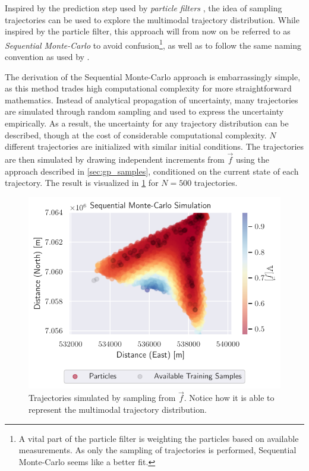Inspired by the prediction step used by \textit{particle filters} \cite{sensorfusjon}, the idea of sampling trajectories can be used to explore the multimodal trajectory distribution. While inspired by the particle filter, this approach will from now on be referred to as \textit{Sequential Monte-Carlo} to avoid confusion\footnote{A vital part of the particle filter is weighting the particles based on available measurements. As only the sampling of trajectories is performed, Sequential Monte-Carlo seems like a better fit.}, as well as to follow the same naming convention as used by \citeauthor{pedestrian} \cite{pedestrian}.

The derivation of the Sequential Monte-Carlo approach is embarrassingly simple, as this method trades high computational complexity for more straightforward mathematics. Instead of analytical propagation of uncertainty, many trajectories are simulated through random sampling and used to express the uncertainty empirically. As a result, the uncertainty for any trajectory distribution can be described, though at the cost of considerable computational complexity.
$N$ different trajectories are initialized with similar initial conditions. The trajectories are then simulated by drawing independent increments from $\vec{f}$ using the approach described in \cref{sec:gp_samples}, conditioned on the current state of each trajectory. The result is visualized in \cref{fig:gp_particle} for $N=500$ trajectories.
\begin{figure}[h]
    \centering
    \includegraphics[width=\textwidth]{figures/dyngp/gp_particle.pdf}
    \caption{Trajectories simulated by sampling from $\vec{f}$. Notice how it is able to represent the multimodal trajectory distribution. }
    \label{fig:gp_particle}
\end{figure}

